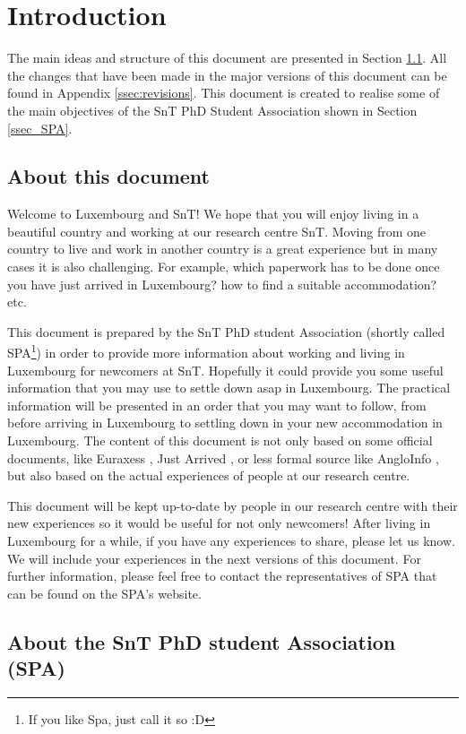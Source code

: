 \section{Introduction}
\label{sect.intro}


The main ideas and structure of this document are presented in Section \ref{ssec_about}. 
All the changes that have been made in the major versions of this document can be found in Appendix \ref{ssec:revisions}. 
This document is created to realise some of the main objectives of the SnT PhD Student Association shown in Section \ref{ssec_SPA}. 

\subsection{About this document} \label{ssec_about}
Welcome to Luxembourg and SnT! We hope that you will enjoy living in a beautiful country and working at our research centre SnT. Moving from one country to live and work in another country is a great experience but in many cases it is also challenging. For example, which paperwork has to be done once you have just arrived in Luxembourg? how to find a suitable accommodation? etc. 

This document is prepared by the SnT PhD student Association (shortly called SPA\footnote{If you like Spa, just call it so :D}) in order to provide more information about working and living in Luxembourg for newcomers at SnT. Hopefully it could provide you some useful information that you may use to settle down asap in Luxembourg. The practical information will be presented in an order that you may want to follow, from before arriving in Luxembourg to settling down in your new accommodation in Luxembourg. 
The content of this document is not only based on some official documents, like Euraxess \cite{Euraxess}, Just Arrived \cite{JustArrived}, or less formal source like AngloInfo \cite{AngloINFO}, but also based on the actual experiences of people at our research centre. 

This document will be kept up-to-date by people in our research centre with their new experiences so it would be useful for not only newcomers! 
After living in Luxembourg for a while, if you have any experiences to share, please let us know. 
We will include your experiences in the next versions of this document. 
For further information, please feel free to contact the representatives of SPA that can be found on the SPA's website. 

\subsection{About the SnT PhD student Association (SPA)}


